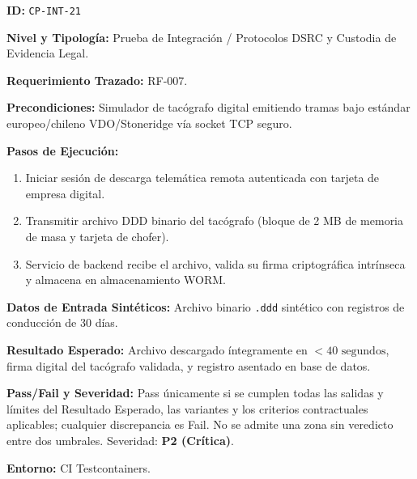 \par\noindent\textbf{ID:} \texttt{C\allowbreak{}P\allowbreak{}-\allowbreak{}I\allowbreak{}N\allowbreak{}T\allowbreak{}-\allowbreak{}2\allowbreak{}1\allowbreak{}}\par
\par\noindent\textbf{Nivel y Tipología:} Prueba de Integración / Protocolos DSRC y Custodia de Evidencia Legal.\par
\par\noindent\textbf{Requerimiento Trazado:} RF-007.\par
\par\noindent\textbf{Precondiciones:} Simulador de tacógrafo digital emitiendo tramas bajo estándar europeo/chileno VDO/Stoneridge vía socket TCP seguro.\par
\par\noindent\textbf{Pasos de Ejecución:} \par
\begin{enumerate}
\item Iniciar sesión de descarga telemática remota autenticada con tarjeta de empresa digital.
\item Transmitir archivo DDD binario del tacógrafo (bloque de 2 MB de memoria de masa y tarjeta de chofer).
\item Servicio de backend recibe el archivo, valida su firma criptográfica intrínseca y almacena en almacenamiento WORM.
\end{enumerate}
\par\noindent\textbf{Datos de Entrada Sintéticos:} Archivo binario \texttt{.\allowbreak{}d\allowbreak{}d\allowbreak{}d\allowbreak{}} sintético con registros de conducción de 30 días.\par
\par\noindent\textbf{Resultado Esperado:} Archivo descargado íntegramente en \(< 40\text{ segundos}\), firma digital del tacógrafo validada, y registro asentado en base de datos.\par
\par\noindent\textbf{Pass/Fail y Severidad:} Pass únicamente si se cumplen todas las salidas y límites del Resultado Esperado, las variantes y los criterios contractuales aplicables; cualquier discrepancia es Fail. No se admite una zona sin veredicto entre dos umbrales. Severidad: \textbf{P2 (Crítica)}.\par
\par\noindent\textbf{Entorno:} CI Testcontainers.\par







